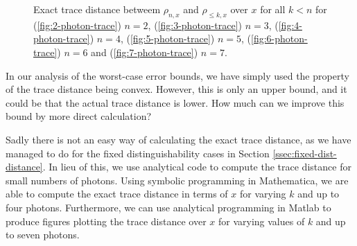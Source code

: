\begin{figure}
\hfill
{}
\caption[Exact trace distance between $\rho_{n,x}$ and $\rho_{\leq k, x}$ over $x$ for $k< n, n=2,\dots,7$]{\label{fig:exact-trace} 
Exact trace distance betweem $\rho_{n,x}$ and $\rho_{\leq k, x}$ over $x$ for all $k < n$ for (\ref{fig:2-photon-trace}) $n=2$, (\ref{fig:3-photon-trace}) $n=3$, (\ref{fig:4-photon-trace}) $n=4$, (\ref{fig:5-photon-trace}) $n=5$, (\ref{fig:6-photon-trace}) $n=6$ and (\ref{fig:7-photon-trace}) $n=7$.}
\end{figure}

In our analysis of the worst-case error bounds, we have simply used the property of the trace distance being convex. However, this is only an upper bound, and it could be that the actual trace distance is lower. How much can we improve this bound by more direct calculation?

Sadly there is not an easy way of calculating the exact trace distance, as we have managed to do for the fixed distinguishability cases in Section \ref{ssec:fixed-dist-distance}. In lieu of this, we use analytical code to compute the trace distance for small numbers of photons. Using symbolic programming in Mathematica, we are able to compute the exact trace distance in terms of $x$ for varying $k$ and up to four photons. Furthermore, we can use analytical programming in Matlab to produce figures plotting the trace distance over $x$ for varying values of $k$ and up to seven photons.

